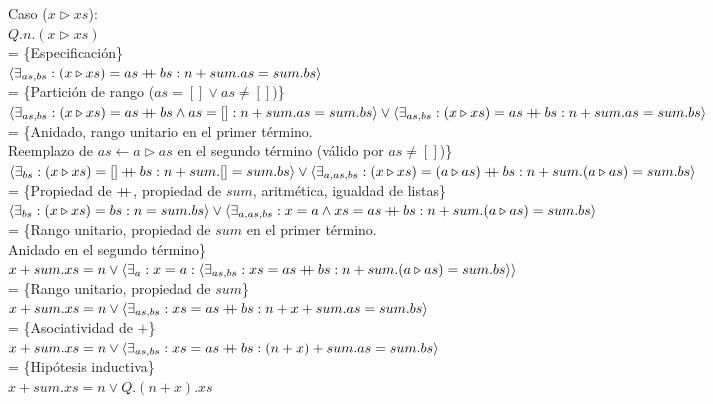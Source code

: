 \documentclass[12pt]{article}
\newcommand{\concat}{%
  \mathbin{{+}\mspace{-8mu}{+}}%
}
\begin{document}
\begin{itemize}
    Caso ($x \triangleright xs$):\\
    $ Q.n.(x \triangleright xs) $\\
    = \{Especificación\}\\
    $ \langle\exists_{as,bs} : (x \triangleright xs) = as \concat bs : n + sum.as = sum.bs \rangle $\\
    = \{Partición de rango ($as = [] \lor as \neq []$)\}\\
    $ \langle\exists_{as,bs} : (x \triangleright xs) = as \concat bs \land as = [] : n + sum.as = sum.bs \rangle \lor \langle\exists_{as,bs} : (x \triangleright xs) = as \concat bs : n + sum.as = sum.bs \rangle $\\
    = \{Anidado, rango unitario en el primer término.\\\hspace*{18pt}Reemplazo de $as \leftarrow a \triangleright as$ en el segundo término (válido por $as \neq []$)\}\\
    $ \langle\exists_{bs} : (x \triangleright xs) = [] \concat bs : n + sum.[] = sum.bs \rangle \lor \langle\exists_{a,as,bs} : (x \triangleright xs) = (a \triangleright as) \concat bs : n + sum.(a \triangleright as) = sum.bs \rangle $\\
    = \{Propiedad de $\concat$, propiedad de $sum$, aritmética, igualdad de listas\}\\
    $ \langle\exists_{bs} : (x \triangleright xs) = bs : n = sum.bs \rangle \lor \langle\exists_{a,as,bs} : x = a \land xs = as \concat bs : n + sum.(a \triangleright as) = sum.bs \rangle $\\
    = \{Rango unitario, propiedad de $sum$ en el primer término.\\\hspace*{18pt}Anidado en el segundo término\}\\
    $ x + sum.xs = n \lor \langle\exists_a : x = a : \langle\exists_{as,bs} : xs = as \concat bs : n + sum.(a \triangleright as) = sum.bs \rangle\rangle $\\
    = \{Rango unitario, propiedad de $sum$\}\\
    $ x + sum.xs = n \lor \langle\exists_{as,bs} : xs = as \concat bs : n + x + sum.as = sum.bs \rangle $\\
    = \{Asociatividad de $+$\}\\
    $ x + sum.xs = n \lor \langle\exists_{as,bs} : xs = as \concat bs : (n + x) + sum.as = sum.bs \rangle $\\
    = \{Hipótesis inductiva\}\\
    $ x + sum.xs = n \lor Q.(n + x).xs $\\


\end{itemize}
\end{document}
